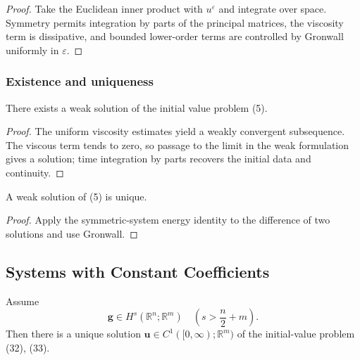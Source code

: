 \begin{proof}
\sketch Take the Euclidean inner product with $u^{\varepsilon}$ and integrate over space. Symmetry permits integration by parts of the principal matrices, the viscosity term is dissipative, and bounded lower-order terms are controlled by Gronwall uniformly in $\varepsilon$.
\end{proof}

\subsubsection{Existence and uniqueness}

\begin{theorem}
\label{thm:symmetric-hyperbolic-existence-weak-solution}
There exists a weak solution of the initial value problem (5).
\end{theorem}

\begin{proof}
\sketch The uniform viscosity estimates yield a weakly convergent subsequence. The viscous term tends to zero, so passage to the limit in the weak formulation gives a solution; time integration by parts recovers the initial data and continuity.
\end{proof}

\begin{theorem}
\label{thm:symmetric-hyperbolic-uniqueness-weak-solution}
A weak solution of (5) is unique.
\end{theorem}

\begin{proof}
\sketch Apply the symmetric-system energy identity to the difference of two solutions and use Gronwall.
\end{proof}

\subsection{Systems with Constant Coefficients}

\begin{theorem}
\label{thm:constant-coefficient-hyperbolic-existence}
Assume
\[
\mathbf{g} \in H^s(\mathbb{R}^n; \mathbb{R}^m) \quad \left(s > \frac{n}{2} + m\right).
\]
Then there is a unique solution $\mathbf{u} \in C^1([0, \infty); \mathbb{R}^m)$ of the initial-value problem (32), (33).
\end{theorem}

